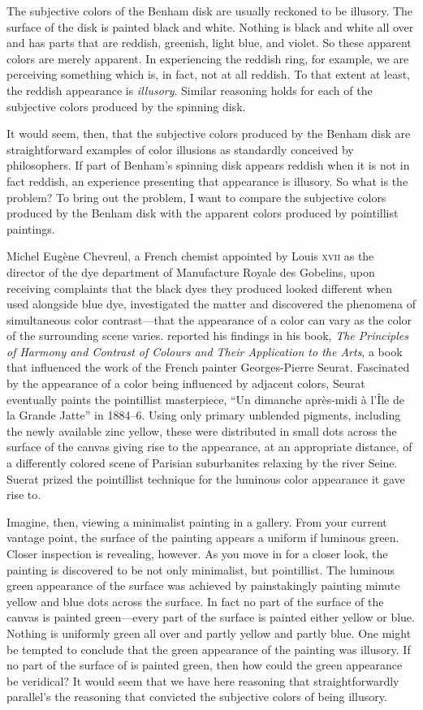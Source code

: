 \documentclass[12pt]{article}
\begin{document}
The subjective colors of the Benham disk are usually reckoned to be illusory. The surface of the disk is painted black and white. Nothing is black and white all over and has parts that are reddish, greenish, light blue, and violet. So these apparent colors are merely apparent. In experiencing the reddish ring, for example, we are perceiving something which is, in fact, not at all reddish. To that extent at least, the reddish appearance is \emph{illusory}. Similar reasoning holds for each of the subjective colors produced by the spinning disk.

It would seem, then, that the subjective colors produced by the Benham disk are straightforward examples of color illusions as standardly conceived by philosophers. If part of Benham's spinning disk appears reddish when it is not in fact reddish, an experience presenting that appearance is illusory. So what is the problem? To bring out the problem, I want to compare the subjective colors produced by the Benham disk with the apparent colors produced by pointillist paintings.

Michel Eugène Chevreul, a French chemist appointed by Louis \textsc{xvii} as the director of the dye department of Manufacture Royale des Gobelins, upon receiving complaints that the black dyes they produced looked different when used alongside blue dye, investigated the matter and discovered the phenomena of simultaneous color contrast---that the appearance of a color can vary as the color of the surrounding scene varies. \citet{Chevreul:1855kx} reported his findings in his book, \emph{The Principles of Harmony and Contrast of Colours and Their Application to the Arts}, a book that influenced the work of the French painter Georges-Pierre Seurat. Fascinated by the appearance of a color being influenced by adjacent colors, Seurat eventually paints the pointillist masterpiece, “Un dimanche après-midi à l'Île de la Grande Jatte” in 1884--6. Using only primary unblended pigments, including the newly available zinc yellow, these were distributed in small dots across the surface of the canvas giving rise to the appearance, at an appropriate distance, of a differently colored scene of Parisian suburbanites relaxing by the river Seine. Suerat prized the pointillist technique for the luminous color appearance it gave rise to.

Imagine, then, viewing a minimalist painting in a gallery. From your current vantage point, the surface of the painting appears a uniform if luminous green. Closer inspection is revealing, however. As you move in for a closer look, the painting is discovered to be not only minimalist, but pointillist. The luminous green appearance of the surface was achieved by painstakingly painting minute yellow and blue dots across the surface. In fact no part of the surface of the canvas is painted green---every part of the surface is painted either yellow or blue. Nothing is uniformly green all over and partly yellow and partly blue. One might be tempted to conclude that the green appearance of the painting was illusory. If no part of the surface of is painted green, then how could the green appearance be veridical? It would seem that we have here reasoning that straightforwardly parallel's the reasoning that convicted the subjective colors of being illusory.
\end{document}
